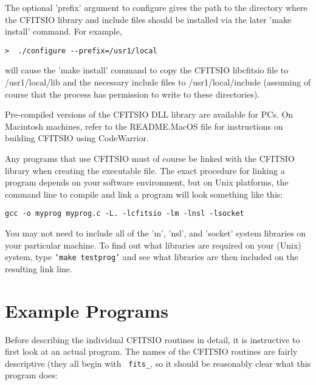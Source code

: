 \documentclass[11pt]{article}
\begin{document}
The optional
'prefix' argument to configure gives the path to the directory where
the CFITSIO library and include files should be installed via the later
'make install' command. For example,

\begin{verbatim}
>  ./configure --prefix=/usr1/local
\end{verbatim}

will cause the 'make install' command to copy the CFITSIO libcfitsio file 
to /usr1/local/lib and the necessary include files to /usr1/local/include
(assuming of course that the  process has permission to write to these 
directories).

Pre-compiled versions of the CFITSIO DLL library are available for
PCs.  On Macintosh machines, refer to the README.MacOS file for
instructions on building CFITSIO using CodeWarrior.

Any programs that use CFITSIO must of course be linked with the CFITSIO
library when creating the executable file.  The exact procedure for
linking a program depends on your software environment, but on Unix
platforms, the command line to compile and link a program will look
something like this:

\begin{verbatim}
gcc -o myprog myprog.c -L. -lcfitsio -lm -lnsl -lsocket
\end{verbatim}

You may not need to include all of the 'm', 'nsl', and 'socket' system
libraries on your particular machine.  To find out what libraries are
required on your (Unix) system, type {\tt'make testprog'} and see what
libraries are then included on the resulting link line.

\newpage
\section{Example Programs}

Before describing the individual CFITSIO routines in detail, it is
instructive to first look at an actual program.  The names of the
CFITSIO routines are fairly descriptive (they all begin with {\tt
fits\_}, so it should be reasonably clear what this program does:
\end{document}
